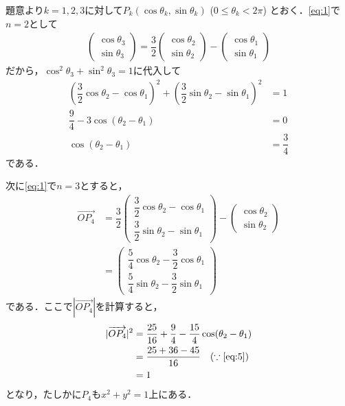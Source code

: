 \documentclass[../../main.tex]{subfiles}
\begin{document}
題意より$k=1,2,3$に対して$P_k(\cos\theta_k, \sin\theta_k)$ ($0 \le \theta_k < 2\pi$) とおく．\cref{eq:1}で$n=2$として
\begin{align}
  \begin{pmatrix} \cos\theta_3 \\ \sin\theta_3
  \end{pmatrix} = \dfrac{3}{2}
  \begin{pmatrix} \cos\theta_2 \\ \sin\theta_2
  \end{pmatrix} -
  \begin{pmatrix} \cos\theta_1 \\ \sin\theta_1
  \end{pmatrix} \label{eq:4}
\end{align}
だから，$\cos^2\theta_3+\sin^2\theta_3=1$に代入して
\begin{align}
  \left(\dfrac{3}{2}\cos\theta_2 - \cos\theta_1\right)^2 + \left(\dfrac{3}{2}\sin\theta_2 - \sin\theta_1\right)^2 &= 1 \\
  \dfrac{9}{4} - 3\cos(\theta_2 - \theta_1) &= 0 \\
  \cos(\theta_2 - \theta_1) &= \dfrac{3}{4} \label{eq:5}
\end{align}
である．

次に\cref{eq:1}で$n=3$とすると，
\begin{align}
  \overrightarrow{OP_4}
  &= \dfrac{3}{2}
  \begin{pmatrix} \dfrac{3}{2}\cos\theta_2 - \cos\theta_1 \\ \dfrac{3}{2}\sin\theta_2 - \sin\theta_1
  \end{pmatrix} -
  \begin{pmatrix} \cos\theta_2 \\ \sin\theta_2
  \end{pmatrix} \\
  &=
  \begin{pmatrix} \dfrac{5}{4}\cos\theta_2 - \dfrac{3}{2}\cos\theta_1 \\ \dfrac{5}{4}\sin\theta_2 - \dfrac{3}{2}\sin\theta_1
  \end{pmatrix}
\end{align}
である．ここで$|\overrightarrow{OP_4}|$を計算すると，
\begin{align}
  |\overrightarrow{OP_4}|^2
  &= \dfrac{25}{16} + \dfrac{9}{4} - \dfrac{15}{4}\cos(\theta_2 - \theta_1) \\
  &= \dfrac{25+36-45}{16} \quad (\because \text{\cref{eq:5}}) \\
  &= 1
\end{align}
となり，たしかに$P_4$も$x^2+y^2=1$上にある．
\end{document}
